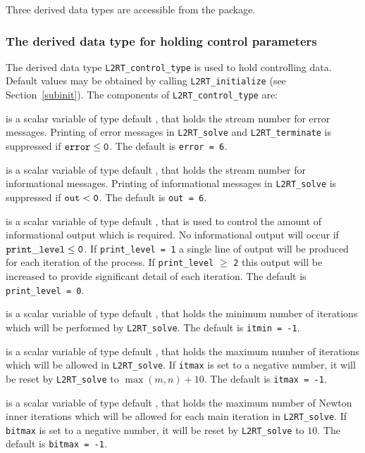 \documentclass{galahad}
\newcommand{\packagename}{L2\-RT}
\begin{document}

\galtypes
Three derived data types are accessible from the package.


\subsubsection{The derived data type for holding control
 parameters}\label{typecontrol}
The derived data type
{\tt \packagename\_control\_type}
is used to hold controlling data. Default values may be obtained by calling
{\tt \packagename\_initialize}
(see Section~\ref{subinit}). The components of
{\tt \packagename\_control\_type}
are:

\begin{description}
 is a scalar variable of type default \integer, that holds the
stream number for error messages.
Printing of error messages in
{\tt \packagename\_solve} and {\tt \packagename\_terminate}
is suppressed if ${\tt error} \leq {\tt 0}$.
The default is {\tt error = 6}.

 is a scalar variable of type default \integer, that holds the
stream number for informational messages.
Printing of informational messages in
{\tt \packagename\_solve} is suppressed if ${\tt out} < {\tt 0}$.
The default is {\tt out = 6}.

 is a scalar variable of type default \integer,
that is used
to control the amount of informational output which is required. No
informational output will occur if ${\tt print\_level} \leq {\tt 0}$. If
{\tt print\_level = 1} a single line of output will be produced for each
iteration of the process. If {\tt print\_level} $\geq$ {\tt 2} this output
will be increased to provide significant detail of each iteration.
The default is {\tt print\_level = 0}.

 is a scalar variable of type default \integer, that holds the
minimum number of iterations which will be performed by
{\tt \packagename\_solve}.
The default is {\tt itmin = -1}.

 is a scalar variable of type default \integer, that holds the
maximum number of iterations which will be allowed in
{\tt \packagename\_solve}.
If {\tt itmax} is set to a negative number, it will be reset by
{\tt \packagename\_solve} to $\max(m,n)+10$.
The default is {\tt itmax = -1}.

 is a scalar variable of type default \integer, that holds the
maximum number of Newton inner iterations which will be allowed for each
main iteration in {\tt \packagename\_solve}.
If {\tt bitmax} is set to a negative number, it will be reset by
{\tt \packagename\_solve} to $10$.
The default is {\tt bitmax = -1}.


\end{description}
\end{document}
